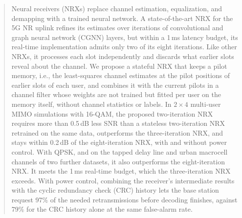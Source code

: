 \begin{abstract}
Neural receivers (NRXs) replace channel estimation, equalization, and demapping with a trained neural network. A state-of-the-art NRX for the 5G NR uplink refines its estimates over iterations of convolutional and graph neural network (CGNN) layers, but within a 1\,ms latency budget, its real-time implementation admits only two of its eight iterations. Like other NRXs, it processes each slot independently and discards what earlier slots reveal about the channel. We propose a stateful NRX that keeps a pilot memory, i.e., the least-squares channel estimates at the pilot positions of earlier slots of each user, and combines it with the current pilots in a channel filter whose weights are not trained but fitted per user on the memory itself, without channel statistics or labels. In $2\times 4$ multi-user MIMO simulations with 16-QAM, the proposed two-iteration NRX requires more than 0.5\,dB less SNR than a stateless two-iteration NRX retrained on the same data, outperforms the three-iteration NRX, and stays within 0.2\,dB of the eight-iteration NRX, with and without power control. With QPSK, and on the tapped delay line and urban macrocell channels of two further datasets, it also outperforms the eight-iteration NRX. It meets the 1\,ms real-time budget, which the three-iteration NRX exceeds. With power control, combining the receiver's intermediate results with the cyclic redundancy check (CRC) history lets the base station request 97\% of the needed retransmissions before decoding finishes, against 79\% for the CRC history alone at the same false-alarm rate.
\end{abstract}
